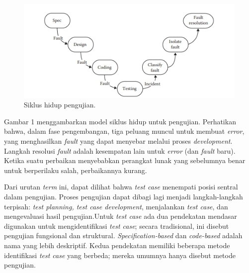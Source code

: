 \documentclass[a4paper,twoside]{article}
\begin{document}
\begin{enumerate}
\begin{figure}
	\includegraphics[scale=1.2]{../DokumenSkripsi/gambar/cycle}
	\centering
	\caption{Siklus hidup pengujian.}
\end{figure}
Gambar 1 menggambarkan model siklus hidup untuk pengujian. Perhatikan bahwa, dalam fase pengembangan, tiga peluang muncul untuk membuat \textit{error}, yang menghasilkan \textit{fault} yang dapat menyebar melalui proses \textit{development}. Langkah resolusi \textit{fault} adalah kesempatan lain untuk \textit{error} (dan \textit{fault} baru). Ketika suatu perbaikan menyebabkan perangkat lunak yang sebelumnya benar untuk berperilaku salah, perbaikannya kurang.

Dari urutan \textit{term} ini, dapat dilihat bahwa \textit{test case} menempati posisi sentral dalam pengujian. Proses pengujian dapat dibagi lagi menjadi langkah-langkah terpisah: \textit{test planning, test case development}, menjalankan \textit{test case}, dan mengevaluasi hasil pengujian.Untuk \textit{test case} ada dua pendekatan mendasar digunakan untuk mengidentifikasi \textit{test case}; secara tradisional, ini disebut pengujian fungsional dan struktural. \textit{Specification-based} dan \textit{code-based} adalah nama yang lebih deskriptif. Kedua pendekatan memiliki beberapa metode identifikasi \textit{test case} yang berbeda; mereka umumnya hanya disebut metode pengujian.


\end{enumerate}
\end{document}
